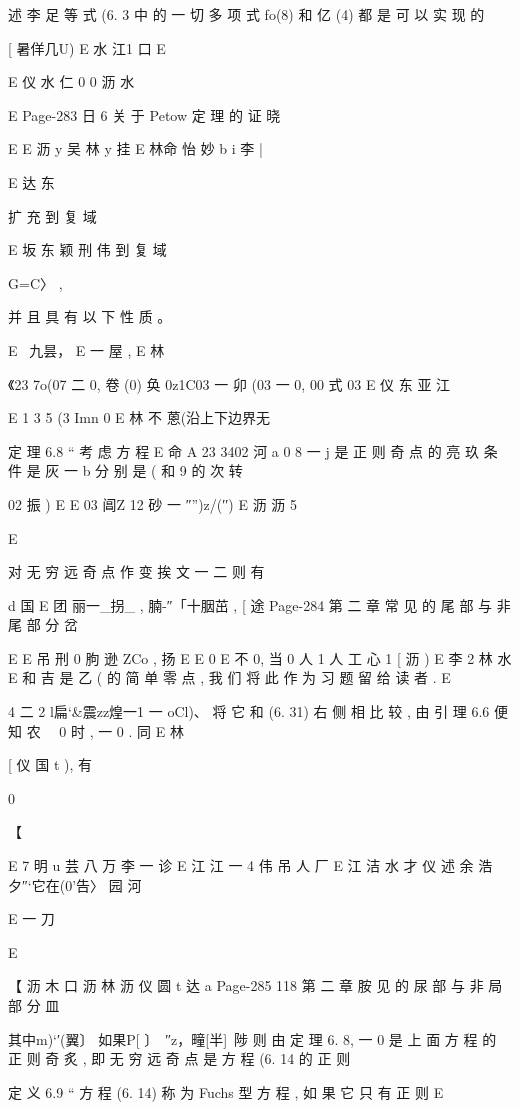 {{{{{{{{{{{{{{述
李
足 等 式 (6. 3 中 的 一 切 多 项 式 fo(8) 和 亿 (4) 都 是 可 以 实 现 的

[ 暑佯几U) E 水 江1 口
E

E 仪 水 仁 0 0 沥 水

E
Page-283
日 6 关 于 Petow 定 理 的 证 晓

E
E 沥 y 吴 林 y 挂
E 林命 怡 妙 b i 李 |

E 达 东

扩 充 到 复 域

E 坂 东 颖 刑 伟
到 复 域

G=C〉 ,

并 且 具 有 以 下 性 质 。

E ~九昙， E 一 屋 , E 林

《23 7o(07 二 0, 卷 (0) 奂 0z1C03 一 卯 (03 一 0, 00 式 03
E 仪 东 亚 江

E 1 3 5
(3 Imn 0 E 林 不 蒽(沿上下边界无

定 理 6.8 “ 考 虑 方 程
E 命 A 23 3402 河 a 0
8 一 j 是 正 则 奇 点 的 亮 玖 条 件 是 灰 一 b 分 别 是 ( 和 9 的 次
转

02 振 ) E E
03 阊Z 12 砂 一 ″”)z/(′′) E 沥 沥 5

E

对 无 穷 远 奇 点 作 变 挨 文 一 二 则 有

d 国 E 团
丽一_拐_ , 腩-″「十胭茁 ,
[ 途
Page-284
第 二 章 常 见 的 尾 部 与 非 尾 部 分 岔

E E 吊 刑
0 朐 逊 ZCo ,
扬
E E
0
E
不 0, 当 0 人 1 人 工 心 1 [ 沥 )
E 李 2 林 水 E
和 吉 是 乙 ( 的 简 单 零 点 , 我 们 将 此 作 为 习 题 留 给 读 者 .
E

4
二 2 l扁`&震zz煌一1 一 oCl)、
将 它 和 (6. 31) 右 侧 相 比 较 , 由 引 理 6.6 便 知 农 ~~0 时 , 一 0 . 同
E 林

[ 仪
国 t
), 有

0

【

E 7 明 u 芸 八 万 李 一 诊
E 江 江 一 4 伟 吊 人 厂
E 江 洁 水 才 仪 述 余 浩 夕″`它在(0'告〉 园 河

E 一 刀

E

【 沥 木 口 沥 林 沥 仪
圆 t 达 a
Page-285
118 第 二 章 胺 见 的 尿 部 与 非 局 部 分 皿

其中m)`′(翼〕 如果P[ 〕~″z，疃[半]~陟 则 由 定 理 6. 8,
一 0 是 上 面 方 程 的 正 则 奇 炙 , 即 无 穷 远 奇 点 是 方 程 (6. 14 的 正 则

定 义 6.9 “ 方 程 (6. 14) 称 为 Fuchs 型 方 程 , 如 果 它 只 有 正 则
E

}}}}}}}}}}}}}}
